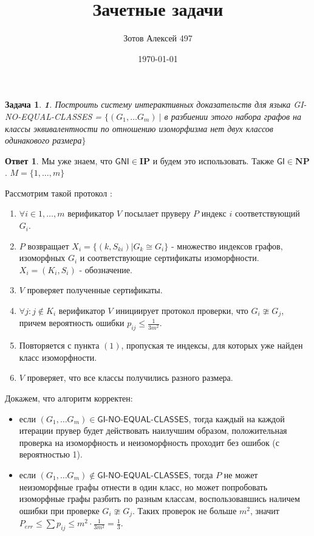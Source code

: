 \documentclass[a4paper]{article}
\title{Зачетные задачи}
\author{Зотов Алексей 497}
\date{\today}
\theoremstyle{plain}
\newtheorem*{task}{Задача}
\theoremstyle{definition}
\newtheorem*{answer}{Ответ}
\begin{document}
\maketitle

\begin{task}{\textbf 1.}
Построить систему интерактивных доказательств для языка \textsf{GI-NO-EQUAL-CLASSES} = $\{(G_1, \ldots G_m) \ |$  в разбиении этого набора графов на классы эквивалентности по отношению изоморфизма нет двух классов одинакового размера$\}$
\end{task}
\begin{answer}  
    Мы уже знаем, что $\textsf{GNI} \in \mathbf{IP}$ и будем это использовать. Также $\textsf{GI} \in \mathbf{NP}$. $M = \{1,\ldots,m\}$
    \item Рассмотрим такой протокол :
    \begin{enumerate}
        \item $\forall i \in 1,\ldots , m$  верификатор $V$ посылает пруверу $P$ индекс $i$ соответствующий $G_i$.
        \item $P$ возвращает $X_i = \{(k,S_{ki}) | G_k \cong G_i\}$ - множество индексов графов, изоморфных $G_i$ и соответствующие сертификаты изоморфности. $X_i = (K_i,S_i)$ - обозначение.
        \item $V$ проверяет полученные сертификаты. 
        \item $\forall j : j \notin K_i$ верификатор $V$ инициирует протокол проверки, что $G_i \ncong G_j$, причем вероятность ошибки $p_{ij} \leq \frac{1}{3m^2}$. 
        \item Повторяется с пункта $(1)$, пропуская те индексы, для которых уже найден класс изоморфности.
        \item $V$ проверяет, что все классы получились разного размера.
    \end{enumerate}
    Докажем, что алгоритм корректен: 
    \begin{itemize}
        \item если $(G_1, \ldots G_m) \in \textsf{GI-NO-EQUAL-CLASSES}$, тогда каждый на каждой итерации прувер будет действовать наилучшим образом, положительная проверка на изоморфность и неизоморфность проходит без ошибок (с вероятностью 1). 
        \item если $(G_1, \ldots G_m) \notin \textsf{GI-NO-EQUAL-CLASSES}$, тогда $P$ не может неизоморфные графы отнести в один класс, но может попробовать изоморфные графы разбить по разным классам, воспользовавшись наличем ошибки при проверке $G_i \ncong G_j$. Таких проверок не больше $m^2$, значит $P_{err} \leq \sum p_{ij} \leq m^2 \cdot \frac{1}{3m^2} = \frac{1}{3}$.
    \end{itemize}
\end{answer}
\end{document}
